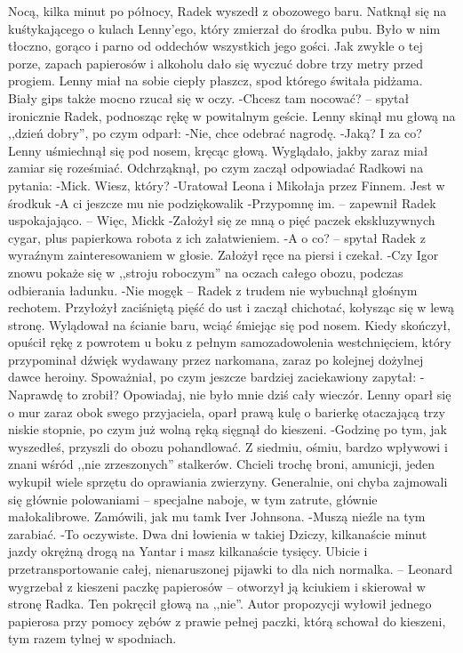 \documentclass[../MAIN.tex]{subfiles}
\begin{document}
\qd
% 
% 
% 
% 
Nocą, kilka minut po północy, Radek wyszedł z obozowego baru. Natknął się na kuśtykającego o kulach Lenny’ego, który zmierzał do środka pubu. Było w nim tłoczno, gorąco i parno od oddechów wszystkich jego gości. Jak zwykle o tej porze, zapach papierosów i alkoholu dało się wyczuć dobre trzy metry przed progiem.
Lenny miał na sobie ciepły płaszcz, spod którego świtała pidżama. Biały gips także mocno rzucał się w oczy.
-Chcesz tam nocować? -- spytał ironicznie Radek, podnosząc rękę w powitalnym geście. Lenny skinął mu głową na ,,dzień dobry'', po czym odparł:
-Nie, chce odebrać nagrodę.
-Jaką? I za co?
Lenny uśmiechnął się pod nosem, kręcąc głową. Wyglądało, jakby zaraz miał zamiar się roześmiać. Odchrząknął, po czym zaczął odpowiadać Radkowi na pytania:
-Mick. Wiesz, który?
-Uratował Leona i Mikołaja przez Finnem. Jest w środku\3k
-A ci jeszcze mu nie podziękowali\3k
-Przypomnę im. -- zapewnił Radek uspokajająco. -- Więc, Mick\3k
-Założył się ze mną o pięć paczek ekskluzywnych cygar, plus papierkowa robota z ich załatwieniem.
-A o co? -- spytał Radek z wyraźnym zainteresowaniem w głosie. Założył ręce na piersi i czekał.
-Czy Igor znowu pokaże się w ,,stroju roboczym'' na oczach całego obozu, podczas odbierania ładunku.
-Nie mogę\3k -- Radek z trudem nie wybuchnął głośnym rechotem. Przyłożył zaciśniętą pięść do ust i zaczął chichotać, kołysząc się w lewą stronę. Wylądował na ścianie baru, wciąć śmiejąc się pod nosem. Kiedy skończył, opuścił rękę z powrotem u boku z pełnym samozadowolenia westchnięciem, który przypominał dźwięk wydawany przez narkomana, zaraz po kolejnej dożylnej dawce heroiny.
Spoważniał, po czym jeszcze bardziej zaciekawiony zapytał:
-Naprawdę to zrobił? Opowiadaj, nie było mnie dziś cały wieczór.
Lenny oparł się o mur zaraz obok swego przyjaciela, oparł prawą kulę o barierkę otaczającą trzy niskie stopnie, po czym już wolną ręką sięgnął do kieszeni.
-Godzinę po tym, jak wyszedłeś, przyszli do obozu pohandlować. Z siedmiu, ośmiu, bardzo wpływowi i znani wśród ,,nie zrzeszonych'' stalkerów. Chcieli trochę broni, amunicji, jeden wykupił wiele sprzętu do oprawiania zwierzyny. Generalnie, oni chyba zajmowali się głównie polowaniami -- specjalne naboje, w tym zatrute, głównie małokalibrowe. Zamówili, jak mu tam\3k Iver Johnsona.
-Muszą nieźle na tym zarabiać.
-To oczywiste. Dwa dni łowienia w takiej Dziczy, kilkanaście minut jazdy okrężną drogą na Yantar i masz kilkanaście tysięcy. Ubicie i przetransportowanie całej, nienaruszonej pijawki to dla nich normalka. -- Leonard wygrzebał z kieszeni paczkę papierosów -- otworzył ją kciukiem i skierował w stronę Radka. Ten pokręcił głową na ,,nie''. Autor propozycji wyłowił jednego papierosa przy pomocy zębów z prawie pełnej paczki, którą schował do kieszeni, tym razem tylnej w spodniach.
\end{document}
